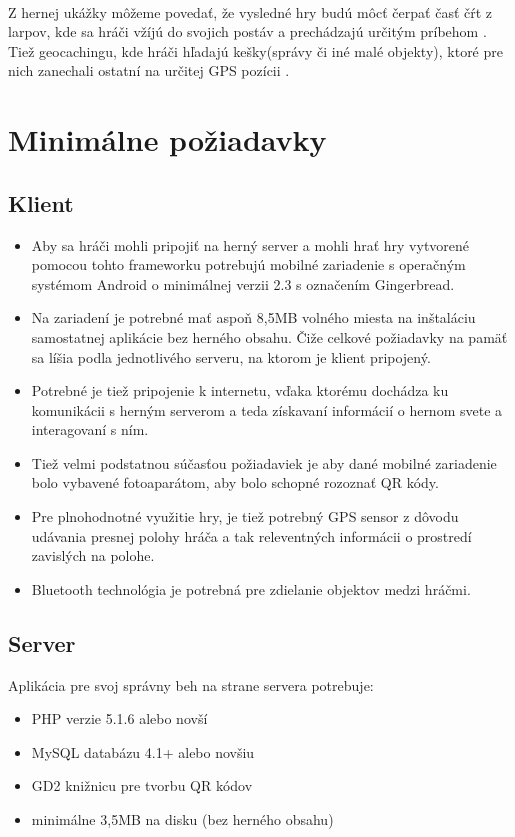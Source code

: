 \paragraph{}
Z hernej ukážky môžeme povedať, že vysledné hry budú môcť čerpať časť čŕt z larpov, kde sa hráči vžíjú do svojich postáv a prechádzajú určitým príbehom \cite{larp-cojeto}. Tiež geocachingu, kde hráči hľadajú kešky(správy či iné malé objekty), ktoré pre nich zanechali ostatní na určitej GPS pozícii \cite{geocaching}.

\section{Minimálne požiadavky}
\subsection{Klient}
\begin{itemize}
\item Aby sa hráči mohli pripojiť na herný server a mohli hrať hry vytvorené pomocou tohto frameworku potrebujú mobilné zariadenie s operačným systémom Android o minimálnej verzii 2.3 s označením Gingerbread. 
\item Na zariadení je potrebné mať aspoň 8,5MB volného miesta na inštaláciu samostatnej aplikácie bez herného obsahu. Čiže celkové požiadavky na pamäť sa líšia podla jednotlivého serveru, na ktorom je klient pripojený. 
\item Potrebné je tiež pripojenie k internetu, vďaka ktorému dochádza ku komunikácii s herným serverom a teda získavaní informácií o hernom svete a interagovaní s ním. 
\item Tiež velmi podstatnou súčasťou požiadaviek je aby dané mobilné zariadenie bolo vybavené fotoaparátom, aby bolo schopné rozoznať QR kódy. 
\item Pre plnohodnotné využitie hry, je tiež potrebný GPS sensor z dôvodu udávania presnej polohy hráča a tak releventných informácii o prostredí zavislých na polohe. 
\item Bluetooth technológia je potrebná pre zdielanie objektov medzi hráčmi. 
\end{itemize}

\subsection{Server}
Aplikácia pre svoj správny beh na strane servera potrebuje:
\begin{itemize}
\item PHP verzie 5.1.6 alebo novší \cite{codeigniter-requirements}
\item MySQL databázu 4.1+ alebo novšiu \cite{codeigniter-requirements}
\item GD2 knižnicu pre tvorbu QR kódov \cite{qrgenerator-info}
\item minimálne 3,5MB na disku (bez herného obsahu)
\end{itemize}

